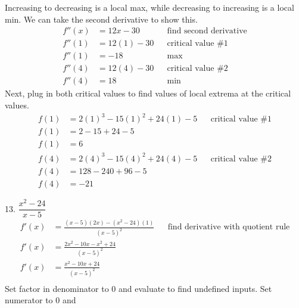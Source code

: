\documentclass{article}
\begin{document}
\begin{description}
\begin{description}
                Increasing to decreasing is a local max, while decreasing to increasing is a local min. We can take the second derivative to show this.
                \begin{align*}
                  f''(x) & = 12x - 30   &  & \text{find second derivative} \\[2em]
                  f''(1) & = 12(1) - 30 &  & \text{critical value \#1}     \\
                  f''(1) & = -18        &  & \text{max}                    \\[2em]
                  f''(4) & = 12(4) - 30 &  & \text{critical value \#2}     \\
                  f''(4) & = 18         &  & \text{min}
                \end{align*}
                Next, plug in both critical values to find values of local extrema at the critical values.
                \begin{align*}
                  f(1) & = 2(1)^3 - 15(1)^2 + 24(1) - 5 &  & \text{critical value \#1} \\
                  f(1) & = 2 - 15 + 24 - 5                                             \\
                  f(1) & = 6                                                           \\[2em]
                  f(4) & = 2(4)^3 - 15(4)^2 + 24(4) - 5 &  & \text{critical value \#2} \\
                  f(4) & = 128 - 240 + 96 - 5                                          \\
                  f(4) & = -21
                \end{align*}
          \item 13. $\dfrac{x^2-24}{x - 5}$
                \begin{align*}
                  f'(x) & = \frac{(x - 5)(2x) - (x^2-24)(1)}{(x - 5)^2} &  & \text{find derivative with quotient rule} \\
                  f'(x) & = \frac{2x^2 - 10x - x^2 + 24}{(x - 5)^2}                                                    \\
                  f'(x) & = \frac{x^2 - 10x + 24}{(x - 5)^2}                                                           \\
                \end{align*}
                Set factor in denominator to 0 and evaluate to find undefined inputs. Set numerator to 0 and

\end{description}
\end{description}
\end{document}
